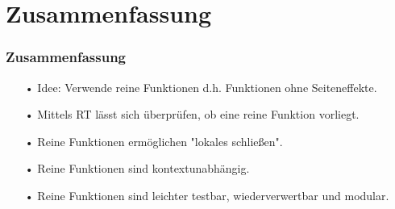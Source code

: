 \section[Section]{Zusammenfassung}
	\begin{frame}[fragile]
	\frametitle{Zusammenfassung}


\begin{itemize}
		\item[•] Idee: Verwende reine Funktionen d.h. Funktionen ohne Seiteneffekte.
		\item[•] Mittels RT lässt sich überprüfen, ob eine reine Funktion vorliegt.
		\item[•] Reine Funktionen ermöglichen "lokales schließen".
		\item[•] Reine Funktionen sind kontextunabhängig. 
		\item[•] Reine Funktionen sind leichter testbar, wiederverwertbar und modular.
\end{itemize} 

\end{frame}